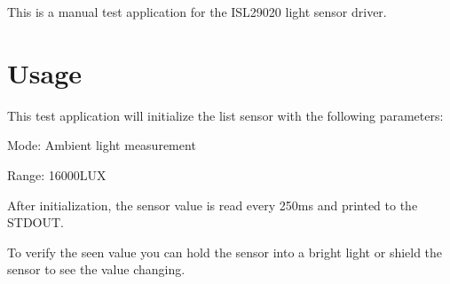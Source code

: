This is a manual test application for the I\+S\+L29020 light sensor driver.

\section*{Usage}

This test application will initialize the list sensor with the following parameters\+:
\begin{DoxyItemize}
\item Mode\+: Ambient light measurement
\item Range\+: 16000\+L\+UX
\end{DoxyItemize}

After initialization, the sensor value is read every 250ms and printed to the S\+T\+D\+O\+UT.

To verify the seen value you can hold the sensor into a bright light or shield the sensor to see the value changing. 
